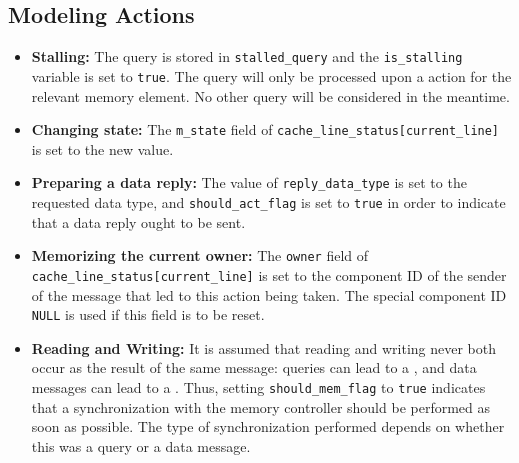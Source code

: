 \subsection{Modeling Actions}
\label{sec:modeling:cmgr_actions}
\begin{itemize}
\item \textbf{Stalling:}
   The query is stored in \lstinline!stalled_query! and the
   \lstinline!is_stalling! variable is set to \lstinline!true!. The query will
   only be processed upon a \resumeact{} action for the relevant memory element.
   No other query will be considered in the meantime.

\item \textbf{Changing state:}
   The \lstinline!m_state! field of \lstinline!cache_line_status[current_line]!
   is set to the new value.

\item \textbf{Preparing a data reply:}
   The value of \lstinline!reply_data_type! is set to the requested data type,
   and \lstinline!should_act_flag! is set to \lstinline!true! in order to
   indicate that a data reply ought to be sent.

\item \textbf{Memorizing the current owner:}
   The \lstinline!owner! field of \lstinline!cache_line_status[current_line]!
   is set to the component ID of the sender of the message that led to this
   action being taken. The special component ID \lstinline!NULL! is used if this
   field is to be reset.

\item \textbf{Reading and Writing:}
   It is assumed that reading and writing never both occur as the result of the
   same message: queries can lead to a \readact{}, and data messages can lead
   to a \writeact{}. Thus, setting \lstinline!should_mem_flag! to
   \lstinline!true! indicates that a synchronization with the memory controller
   should be performed as soon as possible. The type of synchronization
   performed depends on whether this was a query or a data message.
\end{itemize}
